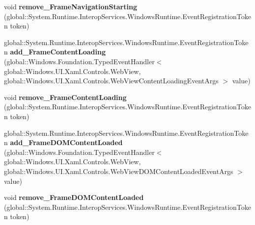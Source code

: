 \begin{DoxyCompactItemize}
\item 
\mbox{\label{class_windows_1_1_u_i_1_1_xaml_1_1_controls_1_1_web_view_a15fa6c1e23767120ecd0bab99639811f}} 
void {\bfseries remove\+\_\+\+Frame\+Navigation\+Starting} (global\+::\+System.\+Runtime.\+Interop\+Services.\+Windows\+Runtime.\+Event\+Registration\+Token token)
\item 
\mbox{\label{class_windows_1_1_u_i_1_1_xaml_1_1_controls_1_1_web_view_a8d37a26b5cf964faa4c2a669dd0bbc73}} 
global\+::\+System.\+Runtime.\+Interop\+Services.\+Windows\+Runtime.\+Event\+Registration\+Token {\bfseries add\+\_\+\+Frame\+Content\+Loading} (global\+::\+Windows.\+Foundation.\+Typed\+Event\+Handler$<$ global\+::\+Windows.\+U\+I.\+Xaml.\+Controls.\+Web\+View, global\+::\+Windows.\+U\+I.\+Xaml.\+Controls.\+Web\+View\+Content\+Loading\+Event\+Args $>$ value)
\item 
\mbox{\label{class_windows_1_1_u_i_1_1_xaml_1_1_controls_1_1_web_view_a820a26d47bb42cedd4d93772a79a6545}} 
void {\bfseries remove\+\_\+\+Frame\+Content\+Loading} (global\+::\+System.\+Runtime.\+Interop\+Services.\+Windows\+Runtime.\+Event\+Registration\+Token token)
\item 
\mbox{\label{class_windows_1_1_u_i_1_1_xaml_1_1_controls_1_1_web_view_aa6e77ed6bfa2e22acd7464193acafbfe}} 
global\+::\+System.\+Runtime.\+Interop\+Services.\+Windows\+Runtime.\+Event\+Registration\+Token {\bfseries add\+\_\+\+Frame\+D\+O\+M\+Content\+Loaded} (global\+::\+Windows.\+Foundation.\+Typed\+Event\+Handler$<$ global\+::\+Windows.\+U\+I.\+Xaml.\+Controls.\+Web\+View, global\+::\+Windows.\+U\+I.\+Xaml.\+Controls.\+Web\+View\+D\+O\+M\+Content\+Loaded\+Event\+Args $>$ value)
\item 
\mbox{\label{class_windows_1_1_u_i_1_1_xaml_1_1_controls_1_1_web_view_a7bb52e44ff34b01256c00f3b7edf4332}} 
void {\bfseries remove\+\_\+\+Frame\+D\+O\+M\+Content\+Loaded} (global\+::\+System.\+Runtime.\+Interop\+Services.\+Windows\+Runtime.\+Event\+Registration\+Token token)
\item 
\mbox{\label{class_windows_1_1_u_i_1_1_xaml_1_1_controls_1_1_web_view_ae1bbfab44411d250900c50ca1c2c604e}} 

\end{DoxyCompactItemize}
